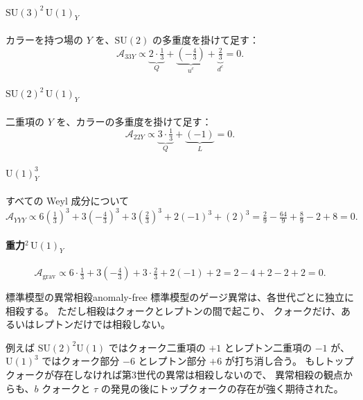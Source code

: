 \documentclass[uplatex,dvipdfmx,a4paper,11pt,openany]{jsbook}
\numberwithin{equation}{chapter}
\theoremstyle{definition}
\theoremstyle{plain}
\theoremstyle{remark}
\newcommand{\SU}{\mathrm{SU}}
\newcommand{\U}{\mathrm{U}}
\begin{document}
\paragraph{$\SU(3)^2\,\U(1)_Y$}
カラーを持つ場の $Y$ を、$\SU(2)$ の多重度を掛けて足す：
\begin{equation}
\mathcal A_{33Y}\propto
\underbrace{2\cdot\tfrac13}_{Q}
+\underbrace{\left(-\tfrac43\right)}_{u^c}
+\underbrace{\tfrac23}_{d^c}
=0 .
\end{equation}
\paragraph{$\SU(2)^2\,\U(1)_Y$}
二重項の $Y$ を、カラーの多重度を掛けて足す：
\begin{equation}
\mathcal A_{22Y}\propto
\underbrace{3\cdot\tfrac13}_{Q}
+\underbrace{(-1)}_{L}
=0 .
\end{equation}
\paragraph{$\U(1)_Y^3$}
すべての Weyl 成分について
\begin{equation}
\mathcal A_{YYY}\propto
6\left(\tfrac13\right)^3+3\left(-\tfrac43\right)^3+3\left(\tfrac23\right)^3+2(-1)^3+(2)^3
=\tfrac29-\tfrac{64}9+\tfrac89-2+8=0 .
\end{equation}
\paragraph{重力$^2\,\U(1)_Y$}
\begin{equation}
\mathcal A_{\mathrm{grav}}\propto
6\cdot\tfrac13+3\left(-\tfrac43\right)+3\cdot\tfrac23+2(-1)+2
=2-4+2-2+2=0 .
\end{equation}
\begin{mythm}{標準模型の異常相殺}{anomaly-free}
標準模型のゲージ異常は、各世代ごとに独立に相殺する。
ただし相殺はクォークとレプトンの間で起こり、
クォークだけ、あるいはレプトンだけでは相殺しない。
\end{mythm}
例えば $\SU(2)^2\U(1)$ ではクォーク二重項の $+1$ とレプトン二重項の $-1$ が、
$\U(1)^3$ ではクォーク部分 $-6$ とレプトン部分 $+6$ が打ち消し合う。
もしトップクォークが存在しなければ第3世代の異常は相殺しないので、
異常相殺の観点からも、$b$ クォークと $\tau$ の発見の後にトップクォークの存在が強く期待された。
\end{document}
